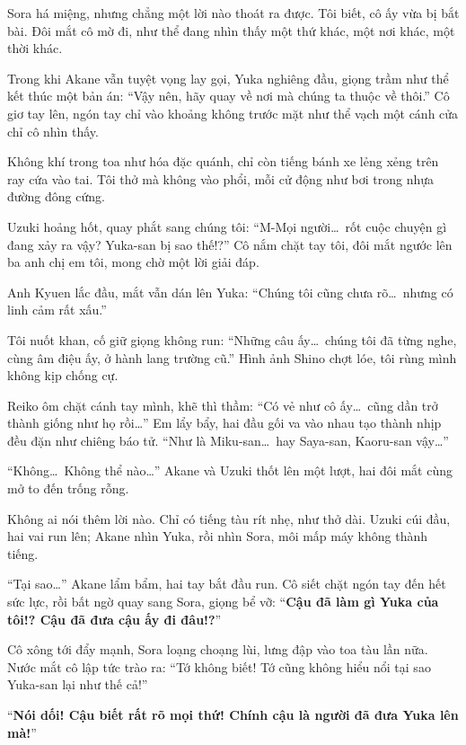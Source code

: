 \documentclass[../main.tex]{subfiles}
\begin{document}
Sora há miệng, nhưng chẳng một lời nào thoát ra được. Tôi biết, cô ấy vừa bị bắt bài. Đôi mắt cô mờ đi, như thể đang nhìn thấy một thứ khác, một nơi khác, một thời khác.

Trong khi Akane vẫn tuyệt vọng lay gọi, Yuka nghiêng đầu, giọng trầm như thể kết thúc một bản án: ``Vậy nên, hãy quay về nơi mà chúng ta thuộc về thôi.'' Cô giơ tay lên, ngón tay chỉ vào khoảng không trước mặt như thể vạch một cánh cửa chỉ cô nhìn thấy.


Không khí trong toa như hóa đặc quánh, chỉ còn tiếng bánh xe lẻng xẻng trên ray cứa vào tai. Tôi thở mà không vào phổi, mỗi cử động như bơi trong nhựa đường đông cứng.

Uzuki hoảng hốt, quay phắt sang chúng tôi: ``M-Mọi người\dots\ rốt cuộc chuyện gì đang xảy ra vậy? Yuka-san bị sao thế!?'' Cô nắm chặt tay tôi, đôi mắt ngước lên ba anh chị em tôi, mong chờ một lời giải đáp.

Anh Kyuen lắc đầu, mắt vẫn dán lên Yuka: ``Chúng tôi cũng chưa rõ\dots\ nhưng có linh cảm rất xấu.''

Tôi nuốt khan, cố giữ giọng không run: ``Những câu ấy\dots\ chúng tôi đã từng nghe, cùng âm điệu ấy, ở hành lang trường cũ.'' Hình ảnh Shino chợt lóe, tôi rùng mình không kịp chống cự.

Reiko ôm chặt cánh tay mình, khẽ thì thầm: ``Có vẻ như cô ấy\dots\ cũng dần trở thành giống như họ rồi\dots'' Em lẩy bẩy, hai đầu gối va vào nhau tạo thành nhịp đều đặn như chiêng báo tử. ``Như là Miku-san\dots\ hay Saya-san, Kaoru-san vậy\dots''

``Không\dots\ Không thể nào\dots'' Akane và Uzuki thốt lên một lượt, hai đôi mắt cùng mở to đến trống rỗng.

Không ai nói thêm lời nào. Chỉ có tiếng tàu rít nhẹ, như thở dài. Uzuki cúi đầu, hai vai run lên; Akane nhìn Yuka, rồi nhìn Sora, môi mấp máy không thành tiếng.

``Tại sao\dots'' Akane lẩm bẩm, hai tay bắt đầu run. Cô siết chặt ngón tay đến hết sức lực, rồi bất ngờ quay sang Sora, giọng bể vỡ: ``\textbf{Cậu đã làm gì Yuka của tôi!? Cậu đã đưa cậu ấy đi đâu!?}''

Cô xông tới đẩy mạnh, Sora loạng choạng lùi, lưng đập vào toa tàu lần nữa. Nước mắt cô lập tức trào ra: ``Tớ không biết! Tớ cũng không hiểu nổi tại sao Yuka-san lại như thế cả!''

``\textbf{Nói dối! Cậu biết rất rõ mọi thứ! Chính cậu là người đã đưa Yuka lên mà!}''
\end{document}

